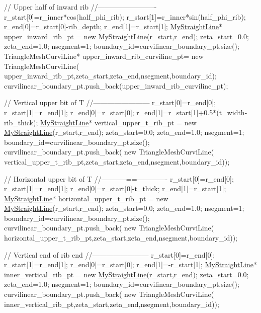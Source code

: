 \begin{DoxyCodeInclude}
 \textcolor{comment}{// Upper half of inward rib}
 \textcolor{comment}{//-------------------------}
 r\_start[0]=r\_inner*cos(half\_phi\_rib);
 r\_start[1]=r\_inner*sin(half\_phi\_rib);
 r\_end[0]=r\_start[0]-rib\_depth;
 r\_end[1]=r\_start[1];
 \hyperlink{classMyStraightLine}{MyStraightLine}* upper\_inward\_rib\_pt = \textcolor{keyword}{new} \hyperlink{classMyStraightLine}{MyStraightLine}(r\_start,r\_end);
 zeta\_start=0.0;
 zeta\_end=1.0;
 nsegment=1;
 boundary\_id=curvilinear\_boundary\_pt.size();
 TriangleMeshCurviLine* upper\_inward\_rib\_curviline\_pt=
  \textcolor{keyword}{new} TriangleMeshCurviLine(
   upper\_inward\_rib\_pt,zeta\_start,zeta\_end,nsegment,boundary\_id);
 curvilinear\_boundary\_pt.push\_back(upper\_inward\_rib\_curviline\_pt);

 \textcolor{comment}{// Vertical upper bit of T}
 \textcolor{comment}{//------------------------}
 r\_start[0]=r\_end[0];
 r\_start[1]=r\_end[1];
 r\_end[0]=r\_start[0];
 r\_end[1]=r\_start[1]+0.5*(t\_width-rib\_thick);
 \hyperlink{classMyStraightLine}{MyStraightLine}* vertical\_upper\_t\_rib\_pt = \textcolor{keyword}{new} \hyperlink{classMyStraightLine}{MyStraightLine}(r\_start,r\_end);
 zeta\_start=0.0;
 zeta\_end=1.0;
 nsegment=1;
 boundary\_id=curvilinear\_boundary\_pt.size();
 curvilinear\_boundary\_pt.push\_back(
  \textcolor{keyword}{new} TriangleMeshCurviLine(
   vertical\_upper\_t\_rib\_pt,zeta\_start,zeta\_end,nsegment,boundary\_id));


 \textcolor{comment}{// Horizontal upper bit of T}
 \textcolor{comment}{//-----------==-------------}
 r\_start[0]=r\_end[0];
 r\_start[1]=r\_end[1];
 r\_end[0]=r\_start[0]-t\_thick;
 r\_end[1]=r\_start[1];
 \hyperlink{classMyStraightLine}{MyStraightLine}* horizontal\_upper\_t\_rib\_pt = \textcolor{keyword}{new} \hyperlink{classMyStraightLine}{MyStraightLine}(r\_start,r\_end);
 zeta\_start=0.0;
 zeta\_end=1.0;
 nsegment=1;
 boundary\_id=curvilinear\_boundary\_pt.size();
 curvilinear\_boundary\_pt.push\_back(
  \textcolor{keyword}{new} TriangleMeshCurviLine(
   horizontal\_upper\_t\_rib\_pt,zeta\_start,zeta\_end,nsegment,boundary\_id));

 \textcolor{comment}{// Vertical end of rib end}
 \textcolor{comment}{//------------------------}
 r\_start[0]=r\_end[0];
 r\_start[1]=r\_end[1];
 r\_end[0]=r\_start[0];
 r\_end[1]=-r\_start[1];
 \hyperlink{classMyStraightLine}{MyStraightLine}* inner\_vertical\_rib\_pt = \textcolor{keyword}{new} \hyperlink{classMyStraightLine}{MyStraightLine}(r\_start,r\_end);
 zeta\_start=0.0;
 zeta\_end=1.0;
 nsegment=1;
 boundary\_id=curvilinear\_boundary\_pt.size();
 curvilinear\_boundary\_pt.push\_back(
  \textcolor{keyword}{new} TriangleMeshCurviLine(
   inner\_vertical\_rib\_pt,zeta\_start,zeta\_end,nsegment,boundary\_id));
 


\end{DoxyCodeInclude}
